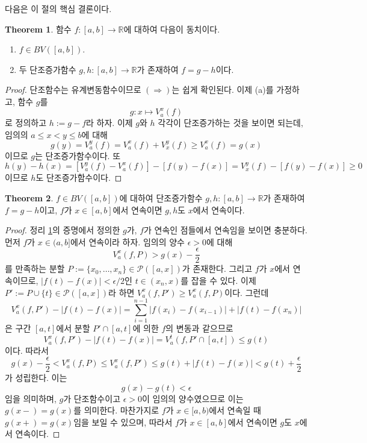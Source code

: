 \documentclass[11pt]{book}
\numberwithin{equation}{chapter}
\def\RR{\mathbb{R}}
\def\eps{\epsilon}
\def\calP{\mathcal{P}}
\newcommand{\abs}[1]{\left\vert#1\right\vert}
\theoremstyle{definition}
\newtheorem{thm}{Theorem}[section]
\newenvironment{enum}
	{\begin{enumerate}[label=(\alph*), leftmargin=2\parindent]}
	{\end{enumerate}}
\begin{document}
다음은 이 절의 핵심 결론이다.

\begin{thm} \label{9.5.8}
    함수 \(f : [a, b] \to \RR\)에 대하여 다음이 동치이다.
    \begin{enum}
        \item \(f \in BV([a, b])\).
        \item 두 단조증가함수 \(g, h : [a, b] \to \RR\)가 존재하여 \(f = g - h\)이다.
    \end{enum}
\end{thm}
\begin{proof}
    단조함수는 유계변동함수이므로 \((\Rightarrow)\)는 쉽게 확인된다. 이제 (a)를 가정하고, 함수 \(g\)를
    \[
        g : x \mapsto V_a^x(f)
    \]
    로 정의하고 \(h := g - f\)라 하자. 이제 \(g\)와 \(h\) 각각이 단조증가하는 것을 보이면 되는데, 임의의 \(a \le x < y \le b\)에 대해
    \[
        g(y) = V_a^y(f) = V_a^x(f) + V_x^y(f) \ge V_a^x(f) = g(x)
    \]
    이므로 \(g\)는 단조증가함수이다. 또
    \[
        h(y) - h(x) = [V_a^y(f) - V_a^x(f)] - [f(y) - f(x)] = V_x^y(f) - [f(y) - f(x)] \ge 0
    \]
    이므로 \(h\)도 단조증가함수이다.
\end{proof}

\begin{thm} \label{9.5.9}
    \(f \in BV([a, b])\)에 대하여 단조증가함수 \(g, h : [a, b] \to \RR\)가 존재하여 \(f = g - h\)이고, \(f\)가 \(x \in [a, b]\)에서 연속이면 \(g, h\)도 \(x\)에서 연속이다.
\end{thm}
\begin{proof}
    정리 \ref{9.5.8}의 증명에서 정의한 \(g\)가, \(f\)가 연속인 점들에서 연속임을 보이면 충분하다.\\
    먼저 \(f\)가 \(x \in (a, b]\)에서 연속이라 하자. 임의의 양수 \(\eps > 0\)에 대해
    \[
        V_a^{x}(f, P) > g(x) - \frac{\eps}{2}
    \]
    를 만족하는 분할 \(P := \{x_0, \ldots, x_n\} \in \calP([a, x])\)가 존재한다. 그리고 \(f\)가 \(x\)에서 연속이므로, \(\abs{f(t) - f(x)} < \eps/2\)인 \(t \in (x_n, x)\)를 잡을 수 있다. 이제 \(P' := P \cup \{t\} \in \calP([a, x])\)라 하면 \(V_a^x(f, P') \ge V_a^x(f, P)\)이다. 그런데
    \[
        V_a^x(f, P') - \abs{f(t) - f(x)} = \sum_{i=1}^{n-1} \abs{f(x_i) - f(x_{i-1})} + \abs{f(t) - f(x_n)}
    \]
    은 구간 \([a, t]\)에서 분할 \(P' \cap [a, t]\)에 의한 \(f\)의 변동과 같으므로
    \[
        V_a^x(f, P') - \abs{f(t) - f(x)} = V_a^t(f, P' \cap [a, t]) \le g(t)
    \]
    이다. 따라서
    \[
        g(x) - \frac{\eps}{2} < V_a^x(f, P) \le V_a^x(f, P') \le g(t) + \abs{f(t) - f(x)} < g(t) + \frac{\eps}{2}
    \]
    가 성립한다. 이는
    \[
        g(x) - g(t) < \eps
    \]
    임을 의미하며, \(g\)가 단조함수이고 \(\eps > 0\)이 임의의 양수였으므로 이는 \(g(x-) = g(x)\)를 의미한다. 마찬가지로 \(f\)가 \(x \in [a, b)\)에서 연속일 때 \(g(x+) = g(x)\)임을 보일 수 있으며, 따라서 \(f\)가 \(x \in [a, b]\)에서 연속이면 \(g\)도 \(x\)에서 연속이다.
\end{proof}
\end{document}
